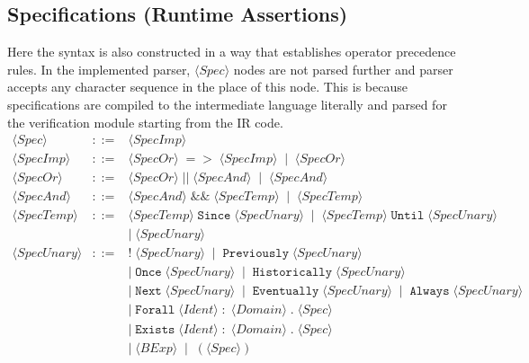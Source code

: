 \documentclass{article}
\begin{document}
\subsection{Specifications (Runtime Assertions)}
Here the syntax is also constructed in a way that establishes operator precedence rules. In the implemented parser, $\langle \mathit{Spec} \rangle$ nodes are not parsed further and parser accepts any character sequence in the place of this node. This is because specifications are compiled to the intermediate language literally and parsed for the verification module starting from the IR code.\footnotemark
\[
\begin{array}{rcl}
\langle \mathit{Spec} \rangle
&::=&
\langle \mathit{SpecImp} \rangle \\[4pt]

\langle \mathit{SpecImp} \rangle
&::=&
\langle \mathit{SpecOr} \rangle\;\mathtt{=>}\;\langle \mathit{SpecImp} \rangle
\;\mid\;
\langle \mathit{SpecOr} \rangle \\[4pt]

\langle \mathit{SpecOr} \rangle
&::=&
\langle \mathit{SpecOr} \rangle\;\mathtt{||}\;\langle \mathit{SpecAnd} \rangle
\;\mid\;
\langle \mathit{SpecAnd} \rangle \\[4pt]

\langle \mathit{SpecAnd} \rangle
&::=&
\langle \mathit{SpecAnd} \rangle\;\mathtt{\&\&}\;\langle \mathit{SpecTemp} \rangle
\;\mid\;
\langle \mathit{SpecTemp} \rangle \\[4pt]

\langle \mathit{SpecTemp} \rangle
&::=&
\langle \mathit{SpecTemp} \rangle\;\mathtt{Since}\;\langle \mathit{SpecUnary} \rangle
\;\mid\;
\langle \mathit{SpecTemp} \rangle\;\mathtt{Until}\;\langle \mathit{SpecUnary} \rangle \\[2pt]
&&
\mid\;
\langle \mathit{SpecUnary} \rangle \\[4pt]

\langle \mathit{SpecUnary} \rangle
&::=&
\mathtt{!}\;\langle \mathit{SpecUnary} \rangle
\;\mid\;
\mathtt{Previously}\;\langle \mathit{SpecUnary} \rangle \\[2pt]
&&
\mid\;
\mathtt{Once}\;\langle \mathit{SpecUnary} \rangle
\;\mid\;
\mathtt{Historically}\;\langle \mathit{SpecUnary} \rangle \\[2pt]
&&
\mid\;
\mathtt{Next}\;\langle \mathit{SpecUnary} \rangle
\;\mid\;
\mathtt{Eventually}\;\langle \mathit{SpecUnary} \rangle
\;\mid\;
\mathtt{Always}\;\langle \mathit{SpecUnary} \rangle \\[2pt]
&&
\mid\;
\mathtt{Forall}\;\langle \mathit{Ident} \rangle\; \mathtt{:}\; \langle \mathit{Domain} \rangle\;\texttt{.}\;\langle \mathit{Spec} \rangle \\[2pt]
&&
\mid\;
\mathtt{Exists}\;\langle \mathit{Ident} \rangle\; \mathtt{:}\; \langle \mathit{Domain} \rangle\;\texttt{.}\;\langle \mathit{Spec} \rangle \\[2pt]
&&
\mid\;
\langle \mathit{BExp} \rangle
\;\mid\;
(\langle \mathit{Spec} \rangle) \\[4pt]


\end{array}\]
\end{document}
